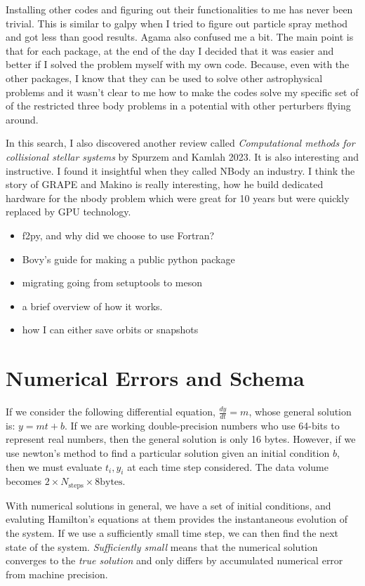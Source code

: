     Installing other codes and figuring out their functionalities to me has never been trivial. This is similar to galpy when I tried to figure out particle spray method and got less than good results. Agama also confused me a bit. The main point is that for each package, at the end of the day I decided that it was easier and better if I solved the problem myself with my own code. Because, even with the other packages, I know that they can be used to solve other astrophysical problems and it wasn't clear to me how to make the codes solve my specific set of of the restricted three body problems in a potential with other perturbers flying around. 

    In this search, I also discovered another review called \textit{Computational methods for collisional stellar systems} by Spurzem and Kamlah 2023. It is also interesting and instructive. I found it insightful when they called NBody an industry. I think the story of GRAPE and Makino is really interesting, how he build dedicated hardware for the nbody problem which were great for 10 years but were quickly replaced by GPU technology. 
    \begin{itemize}
        \item f2py, and why did we choose to use Fortran? 
        \item Bovy's guide for making a public python package
        \item migrating going from setuptools to meson
        \item a brief overview of how it works. 
        \item how I can either save orbits or snapshots
    \end{itemize}



\section{Numerical Errors and Schema} 

    If we consider the following differential equation, $\frac{dy}{dt}=m$, whose general solution is: $y=mt+b$. If we are working double-precision numbers who use 64-bits to represent real numbers, then the general solution is only 16 bytes. However, if we use newton's method to find a particular solution given an initial condition $b$, then we must evaluate $t_i,y_i$ at each time step considered. The data volume becomes $2\times N_\mathrm{steps}\times 8 \mathrm{bytes}$. 

    With numerical solutions in general, we have a set of initial conditions, and evaluting Hamilton's equations at them provides the instantaneous evolution of the system. If we use a sufficiently small time step, we can then find the next state of the system. \textit{Sufficiently small} means that the numerical solution converges to the \textit{true solution} and only differs by accumulated numerical error from machine precision. 

